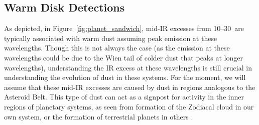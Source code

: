    
   \subsection{Warm Disk Detections}
   
   As depicted, in Figure~\ref{fig:planet_sandwich}, mid-IR excesses from 10--30\micron\ are typically associated with warm dust assuming peak emission at these wavelengths. Though this is not always the case (as the emission at these wavelengths could be due to the Wien tail of colder dust that peaks at longer wavelengths), understanding the IR excess at these wavelengths is still crucial in understanding the evolution of dust in these systems. For the moment, we will assume that these mid-IR excesses are caused by dust in regions analogous to the Asteroid Belt. This type of dust can act as a signpost for activity in the inner regions of planetary systems, as seen from formation of the Zodiacal cloud in our own system, or the formation of terrestrial planets in others \citep{Song2005}. 
   
